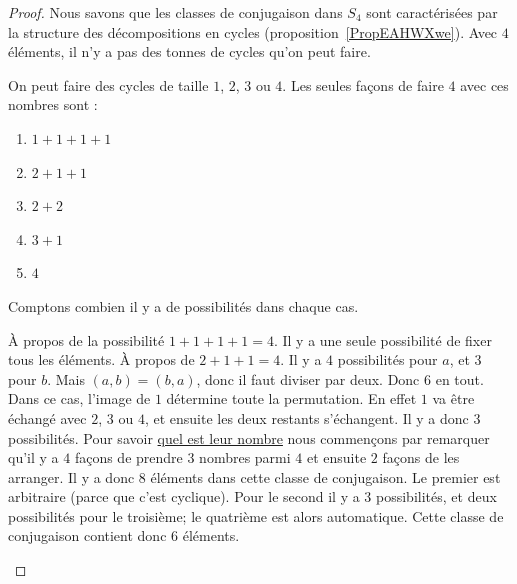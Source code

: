 \begin{proof}
	Nous savons que les classes de conjugaison dans \( S_4\) sont caractérisées par la structure des décompositions en cycles (proposition~\ref{PropEAHWXwe}). Avec \( 4\) éléments, il n'y a pas des tonnes de cycles qu'on peut faire.

	On peut faire des cycles de taille \( 1\), \( 2\), \( 3\) ou \( 4\). Les seules façons de faire \( 4\) avec ces nombres sont :
	\begin{enumerate}
		\item
		      \( 1+1+1+1\)
		\item
		      \( 2+1+1\)
		\item
		      \( 2+2\)
		\item
		      \( 3+1\)
		\item
		      \( 4\)
	\end{enumerate}
	Comptons combien il y a de possibilités dans chaque cas.
	\begin{subproof}
		À propos de la possibilité \( 1+1+1+1=4\). Il y a une seule possibilité de fixer tous les éléments.
		À propos de \( 2+1+1=4\). Il y a \( 4\) possibilités pour \( a\), et \( 3 \) pour \( b\). Mais \( (a,b)=(b,a)\), donc il faut diviser par deux. Donc \( 6\) en tout.
		Dans ce cas, l'image de \( 1\) détermine toute la permutation. En effet \( 1\) va être échangé avec \( 2\), \( 3\) ou \( 4\), et ensuite les deux restants s'échangent. Il y a donc \( 3\) possibilités.
		Pour savoir \href{http://www.toujourspret.com/techniques/expression/chants/C/cantique_des_etoiles.php}{quel est leur nombre} nous commençons par remarquer qu'il y a \( 4\) façons de prendre \( 3\) nombres parmi \( 4\) et ensuite \( 2\) façons de les arranger. Il y a donc \( 8\) éléments dans cette classe de conjugaison.
		Le premier est arbitraire (parce que c'est cyclique). Pour le second il y a \( 3\) possibilités, et deux possibilités pour le troisième; le quatrième est alors automatique. Cette classe de conjugaison contient donc \( 6\) éléments.
	\end{subproof}
\end{proof}

